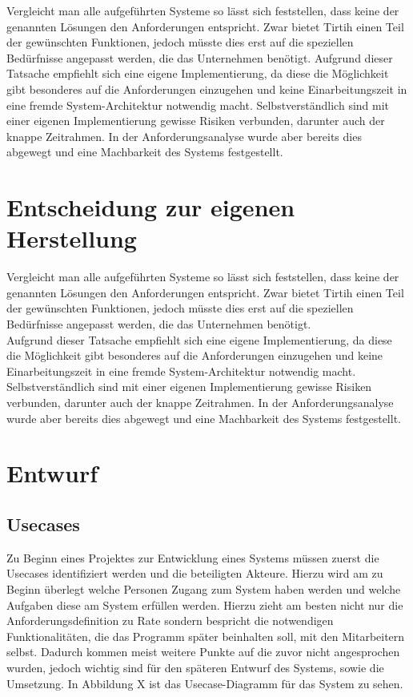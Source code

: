 Vergleicht man alle aufgeführten Systeme so lässt sich feststellen, dass keine der genannten Lösungen den Anforderungen entspricht.
Zwar bietet Tirtih einen Teil der gewünschten Funktionen, jedoch müsste dies erst auf die speziellen Bedürfnisse angepasst werden, die das Unternehmen benötigt.
Aufgrund dieser Tatsache empfiehlt sich eine eigene Implementierung, da diese die Möglichkeit gibt besonderes auf die Anforderungen einzugehen und keine Einarbeitungszeit in eine fremde System-Architektur notwendig macht.
Selbstverständlich sind mit einer eigenen Implementierung gewisse Risiken verbunden, darunter auch der knappe Zeitrahmen. In der Anforderungsanalyse wurde aber bereits dies abgewegt und eine Machbarkeit des Systems festgestellt.

\section{Entscheidung zur eigenen Herstellung}
\label{sec:decisionowncreating}

Vergleicht man alle aufgeführten Systeme so lässt sich feststellen, dass keine der genannten Lösungen den Anforderungen entspricht.
Zwar bietet Tirtih einen Teil der gewünschten Funktionen, jedoch müsste dies erst auf die speziellen Bedürfnisse angepasst werden, die das Unternehmen benötigt.\\
Aufgrund dieser Tatsache empfiehlt sich eine eigene Implementierung, da diese die Möglichkeit gibt besonderes auf die Anforderungen einzugehen und keine Einarbeitungszeit in eine fremde System-Architektur notwendig macht.\\
Selbstverständlich sind mit einer eigenen Implementierung gewisse Risiken verbunden, darunter auch der knappe Zeitrahmen. In der Anforderungsanalyse wurde aber bereits dies abgewegt und eine Machbarkeit des Systems festgestellt.\\



\section{Entwurf}
\label{sec:Entwurf}


\subsection{Usecases}
\label{subsec:usecases}

Zu Beginn eines Projektes zur Entwicklung eines Systems müssen zuerst die Usecases identifiziert werden und die beteiligten Akteure.
Hierzu wird am zu Beginn überlegt welche Personen Zugang zum System haben werden und welche Aufgaben diese am System erfüllen werden. Hierzu zieht am besten nicht nur die Anforderungsdefinition zu Rate sondern bespricht die notwendigen Funktionalitäten, die das Programm später beinhalten soll, mit den Mitarbeitern selbst. Dadurch kommen meist weitere Punkte auf die zuvor nicht angesprochen wurden, jedoch wichtig sind für den späteren Entwurf des Systems, sowie die Umsetzung.
In Abbildung X ist das Usecase-Diagramm für das System zu sehen.

